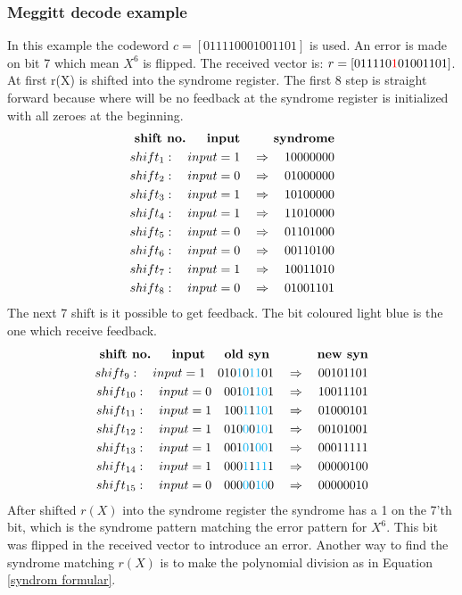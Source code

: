 \documentclass[Main]{subfiles}
\begin{document}
\subsubsection{Meggitt decode example}
\label{sec:MeggittDedocerMaterial}
In this example the codeword $ c = [0 1 1 1 1 0 0 0 1 0 0 1 1 0 1] $ is used.
An error is made on bit 7 which mean $X^6$ is flipped.
The received vector is: $ r = [0 1 1 1 1 0 {\color{red}1} 0 1 0 0 1 1 0 1] $.
At first r(X) is shifted into the syndrome register.
The first 8 step is straight forward because where will be no feedback at the syndrome register is initialized with all zeroes at the beginning.
\begin{eqnarray*}
\textbf{shift no. \quad	input \qquad syndrome}\\
shift_1: \quad input = 1 \quad \Rightarrow \quad 10000000\\
shift_2: \quad input = 0 \quad \Rightarrow \quad 01000000\\
shift_3: \quad input = 1 \quad \Rightarrow \quad 10100000\\
shift_4: \quad input = 1 \quad \Rightarrow \quad 11010000\\
shift_5: \quad input = 0 \quad \Rightarrow \quad 01101000\\
shift_6: \quad input = 0 \quad \Rightarrow \quad 00110100\\
shift_7: \quad input = 1 \quad \Rightarrow \quad 10011010\\
shift_8: \quad input = 0 \quad \Rightarrow \quad 01001101
\end{eqnarray*}
The next 7 shift is it possible to get feedback.
The bit coloured light blue is the one which receive feedback. 
\begin{eqnarray*}
\textbf{shift no. \quad	input \quad old syn \qquad \quad new syn}\\
shift_9: \quad input = 1 \quad 010{\color{cyan}1}0{\color{cyan}11}01 \quad \Rightarrow \quad 00101101\\
shift_{10}: \quad input = 0 \quad 001{\color{cyan}0}1{\color{cyan}10}1 \quad \Rightarrow \quad 10011101\\
shift_{11}: \quad input = 1 \quad 100{\color{cyan}1}1{\color{cyan}10}1 \quad \Rightarrow \quad 01000101\\
shift_{12}: \quad input = 1 \quad 010{\color{cyan}0}0{\color{cyan}10}1 \quad \Rightarrow \quad 00101001\\
shift_{13}: \quad input = 1 \quad 001{\color{cyan}0}1{\color{cyan}00}1 \quad \Rightarrow \quad 00011111\\
shift_{14}: \quad input = 1 \quad 000{\color{cyan}1}1{\color{cyan}11}1 \quad \Rightarrow \quad 00000100\\
shift_{15}: \quad input = 0 \quad 000{\color{cyan}0}0{\color{cyan}10}0 \quad \Rightarrow \quad 00000010
\end{eqnarray*}
After shifted $r(X)$ into the syndrome register the syndrome has a 1 on the 7'th bit, which is the syndrome pattern matching the error pattern for $X^6$.
This bit was flipped in the received vector to introduce an error.
Another way to find the syndrome matching $ r(X) $ is to make the polynomial division as in Equation \ref{syndrom formular}. 
\end{document}
